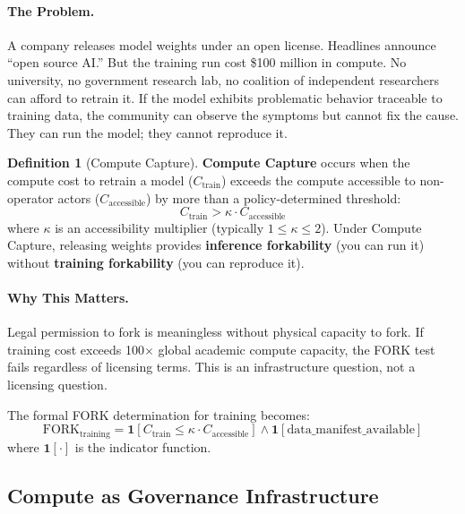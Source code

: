 \documentclass[11pt,a4paper]{article}
\theoremstyle{definition}
\newtheorem{definition}{Definition}[section]
\begin{document}
\paragraph{The Problem.} A company releases model weights under an open license. Headlines announce ``open source AI.'' But the training run cost \$100 million in compute. No university, no government research lab, no coalition of independent researchers can afford to retrain it. If the model exhibits problematic behavior traceable to training data, the community can observe the symptoms but cannot fix the cause. They can run the model; they cannot reproduce it.

\begin{definition}[Compute Capture]
\label{def:compute-capture}
\textbf{Compute Capture} occurs when the compute cost to retrain a model ($C_{\text{train}}$) exceeds the compute accessible to non-operator actors ($C_{\text{accessible}}$) by more than a policy-determined threshold:
\begin{equation}
C_{\text{train}} > \kappa \cdot C_{\text{accessible}}
\label{eq:compute-capture}
\end{equation}
where $\kappa$ is an accessibility multiplier (typically $1 \leq \kappa \leq 2$). Under Compute Capture, releasing weights provides \textbf{inference forkability} (you can run it) without \textbf{training forkability} (you can reproduce it).
\end{definition}

\paragraph{Why This Matters.} Legal permission to fork is meaningless without physical capacity to fork. If training cost exceeds 100$\times$ global academic compute capacity, the FORK test fails regardless of licensing terms. This is an infrastructure question, not a licensing question.

The formal FORK determination for training becomes:
\begin{equation}
\text{FORK}_{\text{training}} = \mathbf{1}[C_{\text{train}} \leq \kappa \cdot C_{\text{accessible}}] \land \mathbf{1}[\text{data\_manifest\_available}]
\label{eq:fork-training}
\end{equation}
where $\mathbf{1}[\cdot]$ is the indicator function.

\subsection{Compute as Governance Infrastructure}
\end{document}
